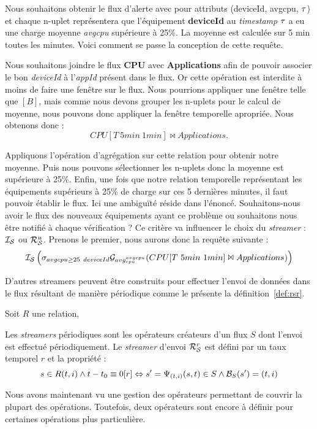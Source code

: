 \begin{example}
    Nous souhaitons obtenir le flux d'alerte avec pour attributs (deviceId, avgcpu, $\tau$) et chaque n-uplet représentera que l'équipement \textbf{deviceId} au \textit{timestamp} $\tau$ a eu une charge moyenne \textit{avgcpu} supérieure à 25\%. La moyenne est calculée sur 5 min toutes les minutes. Voici comment se passe la conception de cette requête.

    Nous souhaitons joindre le flux \textbf{CPU} avec \textbf{Applications} afin de pouvoir associer le bon \textit{deviceId} à l'\textit{appId} présent dans le flux. Or cette opération est interdite à moins de faire une fenêtre sur le flux. Nous pourrions appliquer une fenêtre telle que $[B]$, mais comme nous devons grouper les n-uplets pour le calcul de moyenne, nous pouvons donc appliquer la fenêtre temporelle apropriée. Nous obtenons donc : $$CPU[T\ 5min\ 1min]\Join Applications.$$

    Appliquons l'opération d'agrégation sur cette relation pour obtenir notre moyenne. Puis nous pouvons sélectionner les n-uplets donc la moyenne est supérieure à 25\%. Enfin, une fois que notre relation temporelle représentant les équipements supérieurs à 25\% de charge sur ces 5 dernières minutes, il faut pouvoir établir le flux. Ici une ambiguïté réside dans l'énoncé. Souhaitons-nous avoir le flux des nouveaux équipements ayant ce problème ou souhaitons nous être notifié à chaque vérification ? Ce critère va influencer le choix du \textit{streamer} : $\mathcal{I_S}$ ou $\mathcal{R}_{\mathcal S}^u$. Prenons le premier, nous aurons donc la requête suivante : 
    $$\IS\left(\sigma_{avgcpu \geq 25} \ \null_{deviceId}\G_{avg_{cpu}^{avgcpu}} (CPU[T\ 5min\ 1min]\Join Applications)\right)$$
\end{example}

D'autres streamers peuvent être construits pour effectuer l'envoi de données dans le flux résultant de manière périodique comme le présente la définition~\ref{def:rsr}.
\begin{defi}\label{def:rsr}
    Soit $R$ une relation,

    Les \textit{streamers} périodiques sont les opérateurs créateurs d'un flux $S$ dont l'envoi est effectué périodiquement. Le \textit{streamer} d'envoi $\mathcal{R}_{\mathcal S}^r$ est défini par un taux temporel $r$ et la propriété :
$$s\in R(t,i) \wedge t-t_0\equiv 0[r]\Leftrightarrow s'=\Psi_{(t,i)}(s,t)\in S \wedge \mathcal{B}_S(s') = (t,i)$$
\end{defi}

Nous avons maintenant vu une gestion des opérateurs permettant de couvrir la plupart des opérations. Toutefois, deux opérateurs sont encore à définir pour certaines opérations plus particulière.
